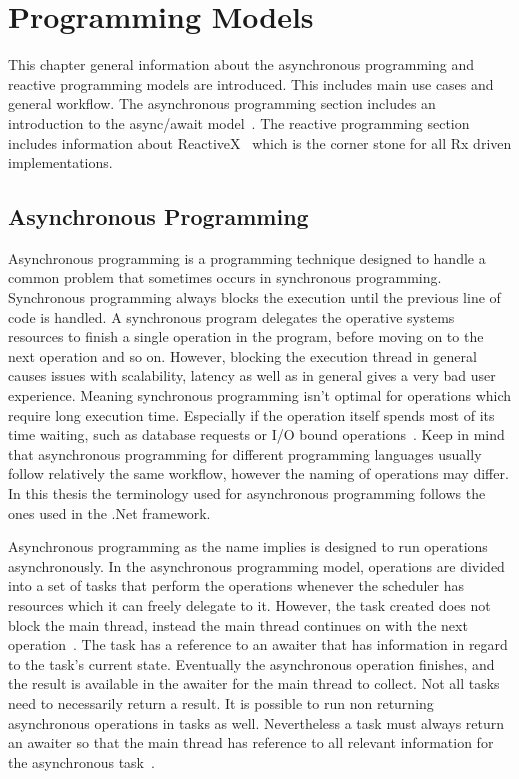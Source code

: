 \chapter{Programming Models}
\label{chapter:ProgrammingModels}
This chapter general information about the asynchronous programming and reactive programming models are introduced. This includes main use cases and general workflow. The asynchronous programming section includes an introduction to the async/await model~\cite{DOC:AsyncAwait}. The reactive programming section includes information about ReactiveX~\cite{WEB:ReactiveXMainPage} which is the corner stone for all Rx driven implementations.
\section{Asynchronous Programming}
\label{section:AsyncProgramming}
Asynchronous programming is a programming technique designed to handle a common problem that sometimes occurs in synchronous programming. Synchronous programming always blocks the execution until the previous line of code is handled. A synchronous program delegates the operative systems resources to finish a single operation in the program, before moving on to the next operation and so on. However, blocking the execution thread in general causes issues with scalability, latency as well as in general gives a very bad user experience. Meaning synchronous programming isn't optimal for operations which require long execution time. Especially if the operation itself spends most of its time waiting, such as database requests or I/O bound operations~\cite{VIDEO:AsyncConBack, WEB:AsyncAwaitTut}. Keep in mind that asynchronous programming for different programming languages usually follow relatively the same workflow, however the naming of operations may differ. In this thesis the terminology used for asynchronous programming follows the ones used in the .Net framework.

Asynchronous programming as the name implies is designed to run operations asynchronously. In the asynchronous programming model, operations are divided into a set of tasks that perform the operations whenever the scheduler has resources which it can freely delegate to it.
However, the task created does not block the main thread, instead the main thread continues on with the next operation~\cite{WEB:AsyncAwaitTut, VIDEO:AsyncConBack, DOC:AsyncAwait}.
The task has a reference to an awaiter that has information in regard to the task's current state. Eventually the asynchronous operation finishes, and the result is available in the awaiter for the main thread to collect. Not all tasks need to necessarily return a result. It is possible to run non returning asynchronous operations in tasks as well. Nevertheless a task must always return an awaiter so that the main thread has reference to all relevant information for the asynchronous task~\cite{WEB:AsyncAwaitTut}.

